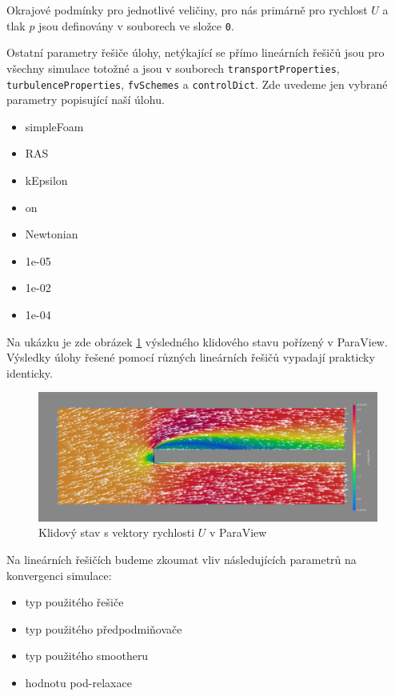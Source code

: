 \documentclass[a4paper,12pt]{report}
\theoremstyle{remark}
\begin{document}
Okrajové podmínky pro jednotlivé veličiny, pro nás primárně pro rychlost $U$ a tlak $p$  jsou definovány v souborech ve složce \texttt{0}.

Ostatní parametry řešiče úlohy, netýkající se přímo lineárních řešičů jsou pro všechny simulace totožné a jsou v souborech \texttt{transportProperties}, \texttt{turbulenceProperties}, \texttt{fvSchemes} a \texttt{controlDict}. Zde uvedeme jen vybrané parametry popisující naší úlohu.

\begin{itemize}
	\item{simpleFoam}
	\item{RAS}
	\item{kEpsilon}
	\item{on}
	\item{Newtonian}
	\item{1e-05}
	\item{1e-02}
	\item{1e-04}
\end{itemize}


	
Na ukázku je zde obrázek \ref{fig:pv-GAMG-GS} výsledného klidového stavu pořízený v ParaView. Výsledky úlohy řešené pomocí různých lineárních řešičů vypadají prakticky identicky.
	
	 \begin{figure}[H]
		\centering
		\includegraphics[width=1\linewidth]{pv-GAMG-GS.png}
		\caption{Klidový stav s vektory rychlosti $U$ v ParaView}
		\label{fig:pv-GAMG-GS}
	\end{figure}


Na lineárních řešičích budeme zkoumat vliv následujících parametrů na konvergenci simulace:
 
\begin{itemize}
	\item typ použitého řešiče
	\item typ použitého předpodmiňovače
	\item typ použitého smootheru
	\item hodnotu pod-relaxace
\end{itemize}
\end{document}

